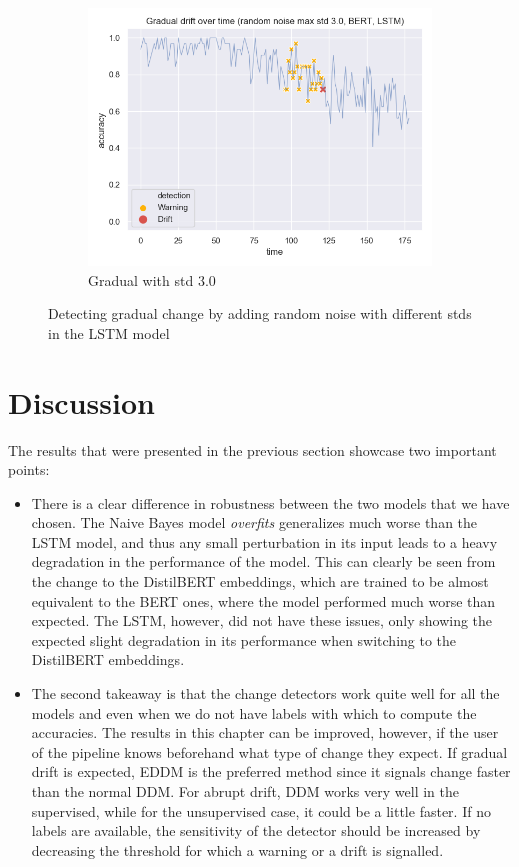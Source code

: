 \documentclass[12pt]{extreport}
\begin{document}
\begin{figure}[H]
\begin{subfigure}{.5\textwidth}
  \centering
  \includegraphics[width=\linewidth]{assets/detecting-change/gradual_noise_random_std_3_lstm_wos_1_BERT.png}
  \caption{Gradual with std 3.0}
  \label{fig:lstm-gradual-std-3}
\end{subfigure}
\caption{Detecting gradual change by adding random noise with different stds in the LSTM model}
\label{fig:lstm-gradual}
\end{figure}

\section{Discussion}

The results that were presented in the previous section showcase two important points:
\begin{itemize}
    \item There is a clear difference in robustness between the two models that we have chosen. The Naive Bayes model \emph{overfits} generalizes much worse than the LSTM model, and thus any small perturbation in its input leads to a heavy degradation in the performance of the model. This can clearly be seen from the change to the DistilBERT embeddings, which are trained to be almost equivalent to the BERT ones, where the model performed much worse than expected. The LSTM, however, did not have these issues, only showing the expected slight degradation in its performance when switching to the DistilBERT embeddings.
    \item The second takeaway is that the change detectors work quite well for all the models and even when we do not have labels with which to compute the accuracies. The results in this chapter can be improved, however, if the user of the pipeline knows beforehand what type of change they expect. If gradual drift is expected, EDDM is the preferred method since it signals change faster than the normal DDM. For abrupt drift, DDM works very well in the supervised, while for the unsupervised case, it could be a little faster. If no labels are available, the sensitivity of the detector should be increased by decreasing the threshold for which a warning or a drift is signalled.
\end{itemize}
\end{document}

